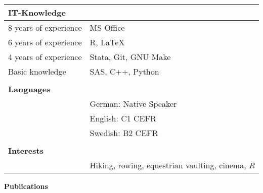 \documentclass[11pt, a4paper]{article}
\begin{document}
\begin{longtable}{p{4cm}p{12cm}}
		\textbf{IT-Knowledge}		& 																			\\ \hline
		8 years of experience       & MS Office 																\\
		6 years of experience		& R, \LaTeX																	\\					
		4 years of experience		& Stata, Git, GNU Make														\\
		Basic knowledge				& SAS, C++, Python															\\
		&																										\\
		\textbf{Languages}  		&																			\\ \hline
		& German: Native Speaker																				\\
		& English: C1 CEFR																						\\
		& Swedish: B2 CEFR																						\\
		&																										\\
		\textbf{Interests}          &                                                                           \\ \hline
		& Hiking, rowing, equestrian vaulting, cinema, \textit{R}           						\\
	\end{longtable}
	\vspace{0.5cm}
	
	\newpage
	\nocite{*}
	\LARGE{\textbf{Publications}}
	\vspace*{-2cm}
	\printbibliography[title = {\mbox{}}]
	
\end{document}
